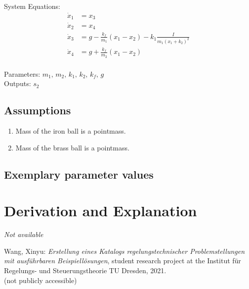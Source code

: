 \documentclass[10pt,a4paper]{article}
\begin{document}
	\noindent System Equations:			
	\begin{subequations}
	\begin{align}
		\dot{x}_1 &= x_3 \\
		\dot{x}_2 &= x_4 \\
		\dot{x}_3 &= g - \frac{k_f}{m_1}(x_1 - x_2) - k_1\frac{I}{m_1(x_1+k_2)^2}  \\
		\dot{x}_4 &= g + \frac{k_f}{m_2}(x_1 - x_2) \\
	\end{align}
	\end{subequations}

	\noindent
	Parameters: $m_1, \, m_2, \, k_1, \, k_2, \, k_f, \, g$  %
	\\
	Outputs: $s_2$ %
	
	
	\subsection{Assumptions} %
		\begin{enumerate} %
			\item Mass of the iron ball is a pointmass.
			\item Mass of the brass ball is a pointmass.
		\end{enumerate}
	
	
	\subsection{Exemplary parameter values}
	

	
	\section{Derivation and Explanation} %
	
	\textit{Not available}
	
	
	\begin{thebibliography}{10}		
		Wang, Xinyu: 
		\textit{Erstellung eines Katalogs regelungstechnischer Problemstellungen mit ausführbaren Beispiellösungen}, student research project at the Institut für Regelungs- und Steuerungstheorie TU Dresden, 2021. \\
		(not publicly accessible)
	\end{thebibliography}
\end{document}
